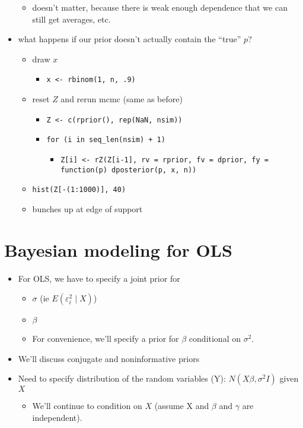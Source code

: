\begin{itemize}
\begin{itemize}
\item doesn't matter, because there is weak enough dependence that we
         can still get averages, etc.
\end{itemize}
\item what happens if our prior doesn't actually contain the ``true'' $p$?
\begin{itemize}
\item draw $x$
\begin{itemize}
\item \texttt{x <- rbinom(1, n, .9)}
\end{itemize}
\item reset $Z$ and rerun mcmc (same as before)
\begin{itemize}
\item \texttt{Z <- c(rprior(), rep(NaN, nsim))}
\item \texttt{for (i in seq\_len(nsim) + 1)}
\begin{itemize}
\item \texttt{Z[i] <- rZ(Z[i-1], rv = rprior, fv = dprior, fy = function(p) dposterior(p, x, n))}
\end{itemize}
\end{itemize}
\item \texttt{hist(Z[-(1:1000)], 40)}
\item bunches up at edge of support
\end{itemize}
\end{itemize}

\section{Bayesian modeling for OLS}

\begin{itemize}
\item For OLS, we have to specify a joint prior for
\begin{itemize}
\item $\sigma$ (ie $E(\varepsilon_{i}^{2}\mid X)$)
\item $\beta$
\item For convenience, we'll specify a prior for $\beta$
        conditional on $\sigma^2$.
\end{itemize}
\item We'll discuss conjugate and noninformative priors
\item Need to specify distribution of the random variables (Y): $N(X\beta,
      \sigma^{2} I)$ given $X$
\begin{itemize}
\item We'll continue to condition on $X$ (assume X and $\beta$ and
        $\gamma$ are independent).
\end{itemize}
\end{itemize}

